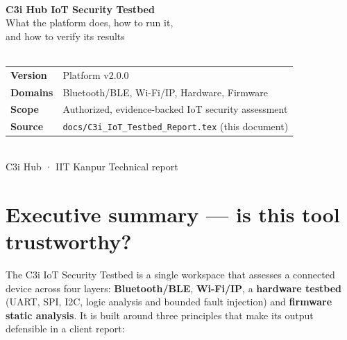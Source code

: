 \documentclass[11pt]{article}
\begin{document}
\sloppy

\begin{titlepage}
\thispagestyle{empty}
\vspace*{3cm}
\noindent{\color{accent}\rule{3cm}{3pt}}\\[1.2cm]
{\Huge\bfseries\color{ink} C3i Hub IoT Security Testbed}\\[0.5cm]
{\LARGE\color{slate} What the platform does, how to run it,\\ and how to verify its results}\\[1.5cm]
\\[2cm]
\noindent\begin{tabular}{@{}ll@{}}
{\bfseries Version} & Platform v2.0.0\\
{\bfseries Domains} & Bluetooth/BLE, Wi-Fi/IP, Hardware, Firmware\\
{\bfseries Scope} & Authorized, evidence-backed IoT security assessment\\
{\bfseries Source} & \texttt{docs/C3i\_IoT\_Testbed\_Report.tex} (this document)\\
\end{tabular}
\vfill
\noindent{\color{accent}\rule{\textwidth}{0.6pt}}\\[2pt]
{\footnotesize\color{slate} C3i Hub · IIT Kanpur \hfill Technical report}
\end{titlepage}

\tableofcontents
\newpage

\section{Executive summary — is this tool trustworthy?}
The C3i IoT Security Testbed is a single workspace that assesses a connected
device across four layers: \textbf{Bluetooth/BLE}, \textbf{Wi-Fi/IP}, a
\textbf{hardware testbed} (UART, SPI, I2C, logic analysis and bounded fault
injection) and \textbf{firmware static analysis}. It is built around three
principles that make its output defensible in a client report:
\end{document}
